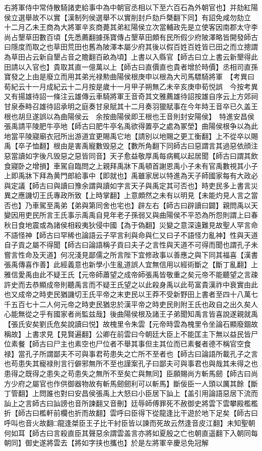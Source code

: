 右將軍侍中常侍散騎諸吏給事中為中朝官丞相以下至六百石為外朝官也】并劾紅陽侯立選舉故不以實【漢制列侯選舉不以實削封戶劾戶槩翻下同】有詔免咸勿劾立　十二月乙未王商為大將軍辛亥商薨其弟紅陽侯立次當輔政先是立使客因南郡太守李尚占墾草田數百頃【先悉薦翻據孫寶傳占墾草田頗有民所假少府陂澤略皆開發師古曰隱度而取之也草田荒田也舊為陂澤本屬少府其後以假百姓百姓皆已田之而立摠謂為草田占云新自墾占音之贍翻百畝為頃】上書以入縣官【師古曰立上書云新墾得此田請以入官也】貴取其直一億萬以上【師古曰直價直也貴者增於時價】丞相司直孫寶發之上由是廢立而用其弟光禄勲曲陽侯根庚申以根為大司馬驃騎將軍　【考異曰荀紀云十一月成紀云十二月按是歲十一月甲子朔無乙未辛亥庚申荀悦誤　今按考異又有揚雄待詔一條注云雄傳云車騎將軍王音奇其文雅薦雄待詔按雄自序云上方郊祠甘泉泰畤召雄待詔承明之庭奏甘泉賦其十二月奏羽獵賦事在今年時王音卒已久盖王根也胡旦遂誤以為曲陽侯云　余按曲陽侯即王根也王音則封安陽侯】　特進安昌侯張禹請平陵肥牛亭地【師古曰肥牛亭名禹欲得置亭之處為冢塋】曲陽侯根争以為此地當平陵寢廟衣冠所出游道宜更賜禹它地【請别以地賜之更工衡翻】上不從卒以賜禹【卒子恤翻】根由是害禹寵數毁惡之【數所角翻下同師古曰惡謂言其過惡依顔注惡當讀如字後凡毁惡之惡皆同音】天子愈益敬厚禹每病輒以起居聞【師古曰謂其飲食寢卧之增損】車駕自臨問之上親拜禹牀下禹頓首謝恩禹小子未有官禹數視其小子上即禹牀下拜為黄門郎給事中【即就也】禹雖家居以特進為天子師國家每有大政必與定議【師古曰與讀曰豫余謂與讀如字言天子與禹定其可否也】時吏民多上書言災異之應譏切王氏專政所致【上時掌翻】上意頗然之未有以明見【未能灼見人言之當否也】乃車駕至禹弟【弟與第同舍也宅也】辟左右【師古曰辟讀曰闢】親問禹以天變因用吏民所言王氏事示禹禹自見年老子孫弱又與曲陽侯不平恐為所怨則謂上曰春秋日食地震或為諸侯相殺夷狄侵中國【為于偽翻】災變之意深遠難見故聖人罕言命不語怪神【師古曰罕稀也論語云子罕言利與命與仁又曰子不語怪力亂神】性與天道自子貢之屬不得聞【師古曰論語稱子貢曰夫子之言性與天道不可得而聞也謂孔子未嘗言性命及天道】何况淺見鄙儒之所言陛下宜修政事以善應之與下同其福喜【漢書張禹傳喜作善】此經義意也新學小生亂道誤人宜無信用以經術斷之【斷丁亂翻】上雅信愛禹由此不疑王氏【元帝師蕭望之成帝師張禹皆敬重之矣元帝不能聽望之言疎許史而去恭顯成帝則聽禹言而不疑王氏望之以此殺身禹以此苟富貴漢祚中衰實由此也又成帝之時吏民猶譏切王氏平帝之末吏民以王莽不受新野田上書者至四十八萬七千五百七十二人何元帝之時吏民猶忠於漢平帝之時吏民則附王氏也政自之出久矣人心能無從之乎有國家者尚監兹哉】後曲陽侯根及諸王子弟聞知禹言皆喜說遂親就禹【張氏安矣劉氏危矣說讀曰悦】故槐里令朱雲【元帝時雲為槐里令坐論石顯廢錮故稱故】上書求見【見賢遍翻】公卿在前雲曰今朝廷大臣上不能匡主下無以益民皆尸位素餐【師古曰尸主也素空也尸位者不舉其事但主其位而已素餐者德不稱官空食禄】當孔子所謂鄙夫不可與事君苟患失之亡所不至者也【師古曰論語所載孔子之言也苟患失其寵禄則言行僻邪無所不至也謹案孔子曰鄙夫可與事君也與哉其未得之也患得之既得之患失之苟患失之無所不至矣亡與無同】臣願賜尚方斬馬劒【師古曰尚方少府之屬官也作供御器物故有斬馬劒劒利可以斬馬】斷佞臣一人頭以厲其餘【斷丁管翻】上問誰也對曰安昌侯張禹上大怒曰小臣居下訕上【盖引用論語惡居下流而訕上之言師古曰訕謗也音所諫翻又音刪】廷辱師傅罪死不赦御史將雲下雲攀殿檻檻折【師古曰檻軒前欄也折而故翻】雲呼曰臣得下從龍逢比干遊於地下足矣【師古曰呼叫也音火故翻□龍逢桀臣王子比干紂臣皆以諫而死故云然逢音皮江翻】未知聖朝何如耳【師古曰言殺直臣其聲惡余謂雲盖言亦將如夏殷之亡也朝直遥翻下入朝同每朝同】御史遂將雲去【將如字挟也攜也】於是左將軍辛慶忌免冠解